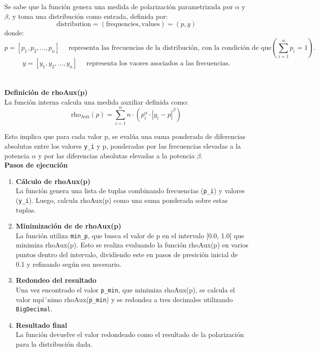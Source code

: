\documentclass{article}
\begin{document}
	Se sabe que la función genera una medida de polarización parametrizada por $\alpha$ y $\beta$, y toma una distribución como entrada, definida por:  
	\[
	\text{distribution} = (\text{frequencies}, \text{values}) = (p, y)
	\]  
	donde: 
	\[
	p = [p_1, p_2, \dots, p_n] \quad \text{ representa las frecuencias de la distribución, con la condición de que}  \left(\sum_{i=1}^n p_i = 1\right).
	\]  
	\[
	y = [y_1, y_2, \dots, y_n] \quad \text{ representa los vaores asociados a las frecuencias.}
	\]  
	\\\\
	\textbf{Definición de rhoAux(p)}\\

	La función interna calcula una medida auxiliar definida como:
	\[
	\text{rho}_{\text{Aux}}(p) = \sum_{i=1}^n n \cdot (p_i^\alpha \cdot |y_i - p|^\beta)
	\]  
	
	Esto implica que para cada valor p, se evalúa una suma ponderada de diferencias absolutas entre los valores \texttt{y\_i} y p, ponderadas por las frecuencias elevadas a la potencia $\alpha$ y por las diferencias absolutas elevadas a la potencia $\beta$.
	\\
	
	\textbf{Pasos de ejecución }\\
	
	\begin{enumerate}
		\item \textbf{Cálculo de rhoAux(p)}\\
		La función genera una lista de tuplas combinando frecuencias (\texttt{p\_i}) y valores (\texttt{y\_i}). Luego, calcula rhoAux(p) como una suma ponderada sobre estas tuplas.
		\item \textbf{Minimización de  de rhoAux(p)}\\
		La función utiliza \texttt{min\_p}, que busca el valor de p en el intervalo [0.0, 1.0] que minimiza rhoAux(p). Esto se realiza evaluando la función rhoAux(p) en varios puntos dentro del intervalo, dividiendo este en pasos de presición inicial de 0.1 y refinando según sea necesario.
		\item \textbf{Redondeo del resultado}\\
		Una vez encontrado el valor \texttt{p\_min}, que minimiza rhoAux(p), se calcula el valor mpí´nimo rhoAux(\texttt{p\_min}) y se redondea a tres decimales utilizando \texttt{BigDecimal}.
		\item \textbf{Resultado final}\\
		La función devuelve el valor redondeado como el resultado de la polarización para la distribución dada.
	\end{enumerate}
\end{document}
